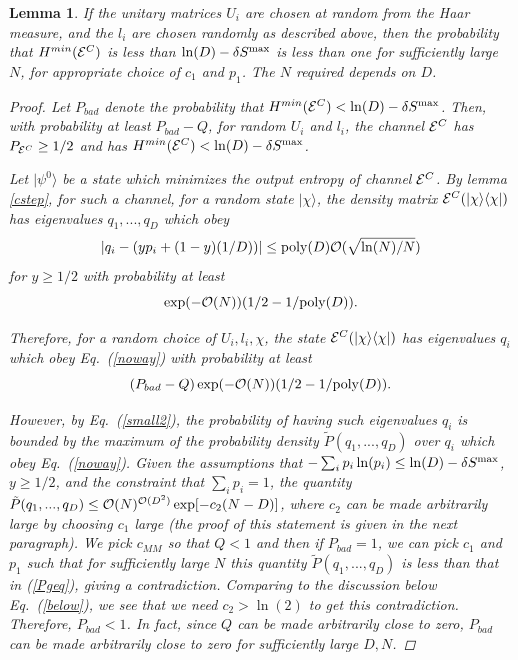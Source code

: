 \documentclass[aps,prl,amsmath,amssymb,amsfonts,superscriptaddress,floatfix]{revtex4}
\newtheorem{lemma}{Lemma}
\newcommand{\dSm}{\delta S^{\rm max}}
\newcommand{\conc}{{\cal E}^C}
\newcommand{\Pb}{P_{bad}}
\newcommand{\be}{\begin{equation}}
\newcommand{\ee}{\end{equation}}
\begin{document}
\begin{lemma}
\label{highent}
If the unitary matrices $U_i$ are chosen at random from the Haar measure,
and the $l_i$ are chosen randomly as described above, then
the probability that $H^{min}(\conc)$ is less than
$\ln(D)-\dSm$
is less than one for sufficiently large $N$, for appropriate choice of
$c_1$ and $p_1$.
The $N$ required depends on $D$.
\begin{proof}
Let $\Pb$ denote the probability that $H^{min}(\conc)<\ln(D)-\dSm$.
Then, with probability at least $\Pb-Q$, for
random $U_i$ and $l_i$,
the channel
${\conc}$ has $P_{\conc}\geq 1/2$ and has $H^{min}(\conc)<\ln(D)-\dSm$.

Let $|\psi^0\rangle$ be a state
which minimizes the output entropy of channel $\conc$.
By lemma \ref{cstep}, for such a channel, for a random state
$|\chi\rangle$, the density matrix $\conc(|\chi\rangle\langle\chi|)$ has
eigenvalues $q_1,...,q_D$ which obey
\be
\label{noway}
|q_i-(yp_i+(1-y)(1/D))|\leq 
{\rm poly}(D)
{\cal O}(\sqrt{\ln(N)/N})
\ee
for $y\geq 1/2$ with probability at least
\be
\exp(-{\cal O}(N)) (1/2-1/{\rm poly}(D)).
\ee

Therefore, for a random choice of $U_i,l_i,\chi$, the
state $\conc(|\chi\rangle\langle\chi|)$ has eigenvalues
$q_i$ which obey Eq.~(\ref{noway}) with probability at
least
\be
\label{Pgeq}
(\Pb-Q) \exp(-{\cal O}(N)) (1/2-1/{\rm poly}(D)).
\ee




However, by Eq.~(\ref{small2}), the probability of having such eigenvalues
$q_i$ is bounded by the maximum of the probability
density $\tilde P(q_1,...,q_D)$ over $q_i$ which obey
Eq.~(\ref{noway}).  Given the assumptions that
$-\sum_i p_i \ln(p_i)\leq \ln(D)-\dSm$, $y\geq 1/2$, and the constraint that
$\sum_i p_i=1$, 
the quantity 
$\tilde P(q_1,...,q_D) \leq
{\cal O}(N)^{{\cal O}(D^2)}\exp[-c_2 (N-D)]$,
where $c_2$ can be made arbitrarily large by choosing $c_1$ large (the proof
of this statement is given in the next paragraph).
We pick $c_{MM}$ so that $Q<1$ and then if $P_{bad}=1$, we can pick
$c_1$ and $p_1$ such that for sufficiently large
$N$ this quantity $\tilde P(q_1,...,q_D)$ is less than that
in (\ref{Pgeq}), giving a contradiction.
Comparing to the discussion
below Eq.~(\ref{below}), we see that we need $c_2>\ln(2)$ to
get this contradiction.
Therefore, $P_{bad}<1$.  In fact, since $Q$ can be
made arbitrarily close to zero, $P_{bad}$ can be made arbitrarily close
to zero for sufficiently large $D,N$.


\end{proof}
\end{lemma}
\end{document}
